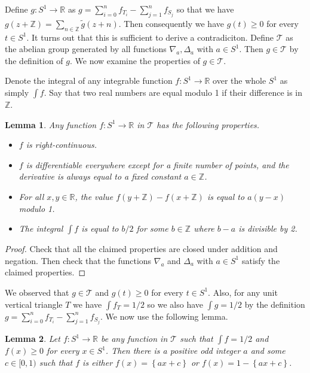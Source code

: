 \documentclass[a4paper]{amsart}
\theoremstyle{plain}
\newtheorem{lemma}{Lemma}
\theoremstyle{definition}
\begin{document}
Define \(g : S^1 \to \mathbb{R}\) as \(g = \sum_{i=0}^n f_{T_i} - \sum_{j=1}^n f_{S_j}\) so that we have \(g(z + \mathbb{Z}) = \sum_{n \in \mathbb{Z}} \tilde{g}(z + n)\). Then consequently we have \(g(t) \geq 0\) for every \(t \in S^1\). 
It turns out that this is sufficient to derive a contradiciton.
Define \(\mathcal{T}\) as the abelian group generated by all functions \(\nabla_a , \Delta_a\) with \(a \in S^1\). Then \(g \in \mathcal{T}\) by the definition of \(g\).
We now examine the properties of $g \in \mathcal{T}$.
 
Denote the integral of any integrable function \(f : S^1 \to \mathbb{R}\) over the whole \(S^1\) as simply \(\int f\).
Say that two real numbers are equal modulo 1 if their difference is in $\mathbb{Z}$.

\begin{lemma}

Any function \(f : S^1 \to \mathbb{R}\) in \(\mathcal{T}\) has the following properties.

\begin{itemize}
\item
  \(f\) is right-continuous.
\item
  \(f\) is differentiable everywhere except for a finite number of points, and the derivative is always equal to a fixed constant \(a \in \mathbb{Z}\).
\item
  For all \(x, y \in \mathbb{R}\), the value \(f(y + \mathbb{Z}) - f(x + \mathbb{Z})\) is equal to \(a(y - x)\) modulo 1.
\item
  The integral \(\int f\) is equal to \(b / 2\) for some \(b \in \mathbb{Z}\) where \(b - a\) is divisible by 2.
\end{itemize}

\label{lem:triangle-group}
\end{lemma}

\begin{proof}
Check that all the claimed properties are closed under addition and negation. Then check that the functions \(\nabla_a\) and \(\Delta_a\) with \(a \in S^1\) satisfy the claimed properties.
\end{proof}

We observed that \(g \in \mathcal{T}\) and \(g(t) \geq 0\) for every \(t \in S^1\). Also, for any unit vertical triangle \(T\) we have \(\int f_T = 1/2\) so we also have \(\int g = 1/2\) by the definition \(g = \sum_{i=0}^n f_{T_i} - \sum_{j=1}^n f_{S_j}\). 
We now use the following lemma.

\begin{lemma}

Let \(f : S^1 \to \mathbb{R}\) be any function in \(\mathcal{T}\) such that \(\int f = 1/2\) and \(f(x) \geq 0\) for every \(x \in S^1\). Then there is a positive odd integer \(a\) and some \(c \in [0, 1)\) such that \(f\) is either \(f(x) = \left\{ ax + c \right\}\) or \(f(x) = 1 - \left\{ ax + c \right\}\).

\label{lem:triangle-unit-area}
\end{lemma}
\end{document}
